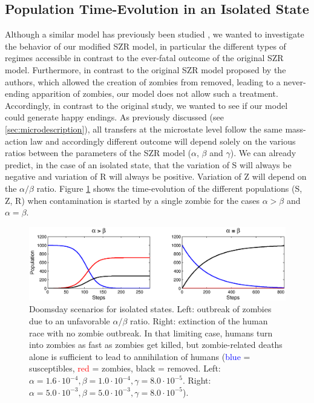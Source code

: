\documentclass[11pt]{article} %
\begin{document}
\subsection{Population Time-Evolution in an Isolated State}\indent
\label{szr}

Although a similar model has previously been studied \cite{munz2009zombies}, we wanted to investigate the behavior of our modified SZR model, \textcolor[rgb]{1,0,0}{in particular the different types of regimes accessible in contrast to the ever-fatal outcome of the original SZR model. Furthermore, in contrast to the original SZR model proposed by the authors, which allowed the creation of zombies from removed, leading to a never-ending apparition of zombies, our model does not allow such a treatment. Accordingly, in contrast to the original study, we wanted to see if our model could generate happy endings.  }As previously discussed (see \ref{sec:microdescription}), all transfers at the microstate level follow the same mass-action law and accordingly different outcome will depend solely on the various ratios between the parameters of the SZR model ($\alpha$, $\beta$ and  $\gamma$). We can already predict, in the case of an isolated state, that the variation of S will always be negative and variation of R will always be positive. Variation of Z will depend on the $\alpha/\beta$ ratio. Figure \ref{deathS} shows the time-evolution of the different populations (S, Z, R) when contamination is started by a single zombie for the cases $\alpha>\beta$ and $\alpha=\beta$.
\begin{figure}[h!]
\centerline{
\includegraphics[scale=0.65]{../images/Matlab_figures/model-AgeB.eps}}
\caption{Doomsday scenarios for isolated states. Left: outbreak of zombies due to an unfavorable $\alpha/\beta$ ratio. Right: extinction of the human race with no zombie outbreak. In that limiting case, humans turn into zombies as fast as zombies get killed, but zombie-related deaths alone is sufficient to lead to annihilation of humans (\textcolor{blue}{blue} = susceptibles, \textcolor{red}{red} = zombies, black = removed. Left: $\alpha=1.6\cdot10^{-4}, \beta=1.0\cdot10^{-4}, \gamma=8.0\cdot10^{-5}$. Right: $\alpha=5.0\cdot10^{-3}, \beta=5.0\cdot10^{-3}, \gamma=8.0\cdot10^{-5} $). \label{deathS} }
\end{figure}
\end{document}
